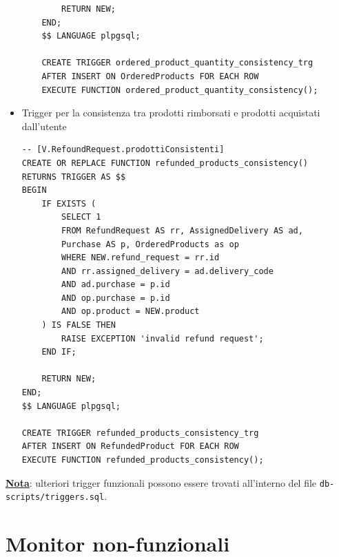 \documentclass[12pt]{report}
\begin{document}
\begin{itemize}
\begin{verbatim}
        RETURN NEW;
    END;
    $$ LANGUAGE plpgsql;
    
    CREATE TRIGGER ordered_product_quantity_consistency_trg
    AFTER INSERT ON OrderedProducts FOR EACH ROW
    EXECUTE FUNCTION ordered_product_quantity_consistency();
    \end{verbatim}

    \newpage
    
    \item Trigger per la consistenza tra prodotti rimborsati e prodotti acquistati dall'utente

    \begin{verbatim}
-- [V.RefoundRequest.prodottiConsistenti]
CREATE OR REPLACE FUNCTION refunded_products_consistency()
RETURNS TRIGGER AS $$
BEGIN
    IF EXISTS (
        SELECT 1 
        FROM RefundRequest AS rr, AssignedDelivery AS ad,
        Purchase AS p, OrderedProducts as op
        WHERE NEW.refund_request = rr.id 
        AND rr.assigned_delivery = ad.delivery_code
        AND ad.purchase = p.id
        AND op.purchase = p.id
        AND op.product = NEW.product
    ) IS FALSE THEN
        RAISE EXCEPTION 'invalid refund request';
    END IF;

    RETURN NEW;
END;
$$ LANGUAGE plpgsql;

CREATE TRIGGER refunded_products_consistency_trg
AFTER INSERT ON RefundedProduct FOR EACH ROW
EXECUTE FUNCTION refunded_products_consistency();
    \end{verbatim}
        
    \end{itemize}

    \underline{\textbf{Nota}}: ulteriori trigger funzionali possono essere trovati all'interno del file \texttt{db-scripts/triggers.sql}.

    \newpage
    
    \section{Monitor non-funzionali}
\end{document}
